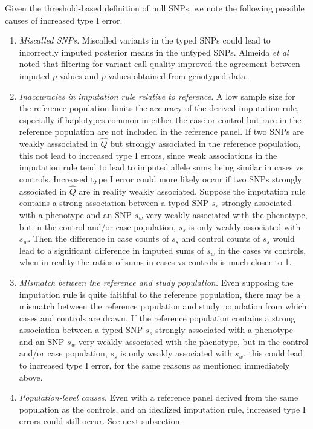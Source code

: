 \documentclass[12pt]{article}
\begin{document}
Given the threshold-based definition of null SNPs, we note the
following
possible causes of increased type I error.
\begin{enumerate}
\item \emph{Miscalled SNPs.}
Miscalled variants in the typed SNPs could lead to incorrectly
imputed posterior means in the untyped SNPs.
Almeida \emph{et al} \cite{Almeida2011} noted that filtering for
variant call quality improved the agreement between imputed $p$-values
and $p$-values obtained from genotyped data.
\item \emph{Inaccuracies in imputation rule relative to reference.}
A low sample size for the reference population
limits the accuracy of the derived imputation rule,
especially if haplotypes common in either the case or control
but rare in the reference population are not included
in the reference panel.
If two SNPs are weakly asssociated in $\hat{Q}$ but strongly
associated in the reference population, this not lead to increased type I errors,
since weak associations in the imputation rule tend to lead to imputed
allele sums being similar in cases vs controls.
Increased type I error could more likely occur if
two SNPs strongly associated in $\hat{Q}$
are in reality weakly associated.
Suppose the imputation rule contains a strong association between
a typed SNP $s_s$ strongly associated with a phenotype
and an SNP $s_w$ very weakly associated with the phenotype,
but in the control and/or case population, $s_s$ is only weakly
associated with $s_w$.
Then the difference in case counts of $s_s$ and control counts of
$s_s$
would lead to a significant difference in imputed sums of $s_w$ in
the cases vs controls, when in reality the ratios of sums in cases vs
controls is much closer to 1.
\item \emph{Mismatch between the reference and study population.}
Even supposing the imputation rule is quite faithful to the reference
population,
there may be a mismatch between the reference population and study
population
from which cases and controls are drawn.
If the reference population contains a strong association between
a typed SNP $s_s$ strongly associated with a phenotype
and an SNP $s_w$ very weakly associated with the phenotype,
but in the control and/or case population, $s_s$ is only weakly
associated with $s_w$, this could lead to increased type I error,
for the same reasons as mentioned immediately above.
\item \emph{Population-level causes.}
Even with a reference panel derived from the same population as the controls,
and an idealized imputation rule,
increased type I errors could still occur.
See next subsection.
\end{enumerate}
\end{document}
